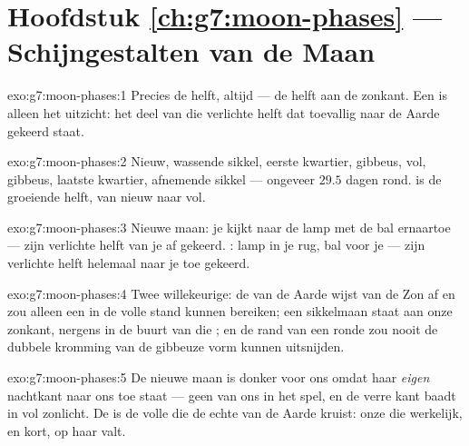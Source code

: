 \section*{Hoofdstuk \ref{ch:g7:moon-phases} --- Schijngestalten van de Maan}

\begin{solution}{exo:g7:moon-phases:1}
Precies de helft, altijd --- de helft aan de zonkant. Een
 is alleen het uitzicht: het deel van die verlichte
helft dat toevallig naar de Aarde gekeerd staat.
\end{solution}

\begin{solution}{exo:g7:moon-phases:2}
Nieuw, wassende sikkel, eerste kwartier,  gibbeus,
vol,  gibbeus, laatste kwartier, afnemende
sikkel --- ongeveer $29.5$ dagen rond.  is de groeiende
helft, van nieuw naar vol.
\end{solution}

\begin{solution}{exo:g7:moon-phases:3}
Nieuwe maan: je kijkt naar de lamp met de bal ernaartoe --- zijn
verlichte helft van je af gekeerd. : lamp in je rug, bal
voor je --- zijn verlichte helft helemaal naar je toe gekeerd.
\end{solution}

\begin{solution}{exo:g7:moon-phases:4}
Twee willekeurige: de  van de Aarde wijst van de Zon af en
zou alleen een  in de volle stand kunnen bereiken; een
sikkelmaan staat aan onze zonkant, nergens in de buurt van die
; en de rand van een ronde  zou nooit de dubbele
kromming van de gibbeuze vorm kunnen uitsnijden.
\end{solution}

\begin{solution}{exo:g7:moon-phases:5}
De nieuwe maan is donker voor ons omdat haar \emph{eigen} nachtkant
naar ons toe staat --- geen  van ons in het spel, en de verre
kant baadt in vol zonlicht. De  is de volle
 die de echte  van de Aarde kruist: onze
 die werkelijk, en kort, op haar valt.
\end{solution}

